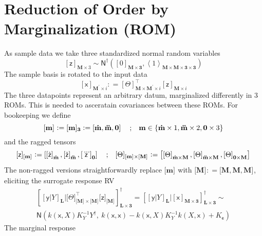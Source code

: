 \documentclass[preprint,12pt]{elsarticle}
\newcommand*{\M}[1]{\ensuremath{#1}\xspace}
\newcommand*{\x}{\times}
\newcommand*{\mi}[1]{\mathbf{#1}}
\newcommand*{\rv}[1]{\mathsf{#1}}
\newcommand*{\te}[2][]{\left\lbrack{#2}\right\rbrack_{#1}}
\newcommand*{\tte}[2][]{\lbrack{#2}\rbrack_{#1}}
\newcommand*{\tse}[2][]{\mi{\lbrack#2\rbrack}_{#1}}
\newcommand*{\tme}[3][]{\lbrack{#3}\rbrack_{\tse[#1]{#2}}}
\newcommand*{\diag}[2][]{\left\langle{#2}\right\rangle_{#1}}
\newcommand*{\deq}{\M{\mathrel{\mathop:}=}}
\newcommand{\T}[1]{\text{#1}}
\newcommand*{\QT}[2][]{\M{\quad\T{#2}\ifthenelse{\equal{#1}{}}{\quad}{#1}}}
\newcommand*{\gauss}[2]{\mathsf{N}\!\left({#1,#2}\right)}
\newcommand*{\gaussd}[2]{\mathsf{N}^{\dagger}\!\left({#1,#2}\right)}
\newcommand*{\set}[1]{\M{\left\lbrace{#1}\right\rbrace}}
\begin{document}
    \section{Reduction of Order by Marginalization (ROM)} \label{sec:ROM}
        As sample data we take three standardized normal random variables
        \begin{equation} \label{def:ROM:zDist}
            \te[\mi{M}\x 3]{\rv{z}} \sim \gaussd{\te[\mi{M\x 3}]{0}}{\diag[\mi{M\x M\x 3\x 3}]{1}}
        \end{equation}
        The sample basis is rotated to the input data
        \begin{equation} \label{def:ROM:rotation}
            \te[\mi{M^{\prime}}\x i]{\rv{x}} \deq \te[\mi{M\x M^{\prime}}\x i]{\Theta}^{\intercal} \te[\mi{M}\x i]{\rv{z}}
        \end{equation}
        The three datapoints represent an arbitrary datum, marginalized differently in 3 ROMs. This is needed to asceratain covariances between these ROMs. For bookeeping we define
        \begin{equation*}
            \tte[]{\mi{m}} \deq \tte[\mi{3}]{\mi{m}} \deq \te{\mi{\dot{m}},\mi{\ddot{m}},\mi{0}} \QT{;} 
            \mi{m} \in \set{\mi{\dot{m}}\x 1,\mi{\ddot{m}}\x 2,\mi{0}\x 3}
        \end{equation*}
        and the ragged tensors
        \begin{equation*}
                \tme{m}{\rv{z}} \deq
                \te{\te[\mi{\dot{m}}]{\rv{\dot{z}}} , \te[\mi{\ddot{m}}]{\rv{\ddot{z}}} , \te[\mi{0}]{\rv{\dddot{z}}}} \QT{;}
                \tte[\tse{m}\x\tse{M}]{\Theta} \deq
                \te{\te[\mi{\dot{m}\x M}]{\Theta} , \te[\mi{\ddot{m}\x M}]{\Theta} , \te[\mi{0\x M}]{\Theta}}
        \end{equation*}
        The non-ragged versions straightforwardly replace $\tte{\mi{m}}$ with $\tte{\mi{M}}\deq \tte{\mi{M},\mi{M},\mi{M}}$, eliciting the surrogate response RV
        \begin{multline} \label{def:ROM:predictive}
            \te[\mi{L\x 3}]{\te[\mi{L}]{\rv{y} \vert Y} \big\vert \tte[\tse{M}\x\tse{M}]{\Theta}^{\intercal} \tme{M}{\rv{z}}}^{\dagger} =
            \te[\mi{L\x 3}]{\te[\mi{L}]{\rv{y} \vert Y} \big\vert \te[\mi{M\x 3}]{\rv{x}}}^{\dagger} \sim \\
            \gauss{k(\rv{x},X) K_{Y}^{-1} Y^{\dagger}}{\ k(\rv{x},\rv{x}) - k(\rv{x},X) K_{Y}^{-1} k(X,\rv{x}) + {K_{\rv{e}}}}
        \end{multline}
        The marginal response
\end{document}
